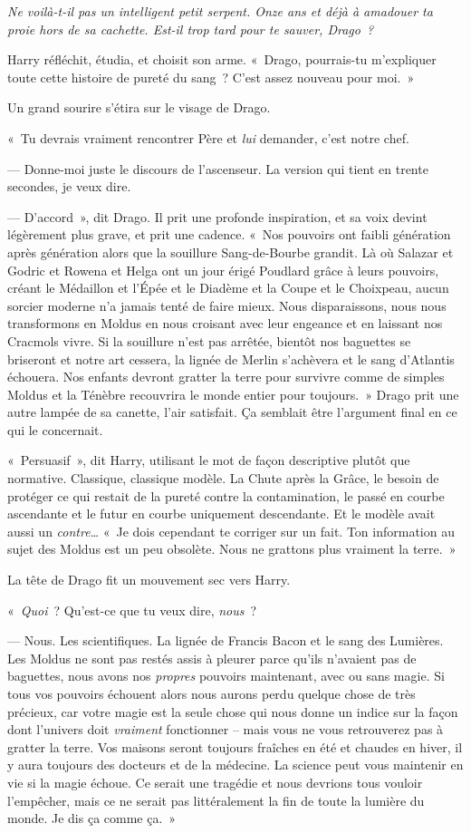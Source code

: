 \emph{Ne voilà-t-il pas un intelligent petit serpent. Onze ans et déjà à amadouer ta proie hors de sa cachette. Est-il trop tard pour te sauver, Drago~?}

Harry réfléchit, étudia, et choisit son arme. «~Drago, pourrais-tu m'expliquer toute cette histoire de pureté du sang~? C'est assez nouveau pour moi.~»

Un grand sourire s'étira sur le visage de Drago.

«~Tu devrais vraiment rencontrer Père et \emph{lui} demander, c'est notre chef.

--- Donne-moi juste le discours de l'ascenseur. La version qui tient en trente secondes, je veux dire.

--- D'accord~», dit Drago. Il prit une profonde inspiration, et sa voix devint légèrement plus grave, et prit une cadence. «~Nos pouvoirs ont faibli génération après génération alors que la souillure Sang-de-Bourbe grandit. Là où Salazar et Godric et Rowena et Helga ont un jour érigé Poudlard grâce à leurs pouvoirs, créant le Médaillon et l'Épée et le Diadème et la Coupe et le Choixpeau, aucun sorcier moderne n'a jamais tenté de faire mieux. Nous disparaissons, nous nous transformons en Moldus en nous croisant avec leur engeance et en laissant nos Cracmols vivre. Si la souillure n'est pas arrêtée, bientôt nos baguettes se briseront et notre art cessera, la lignée de Merlin s'achèvera et le sang d'Atlantis échouera. Nos enfants devront gratter la terre pour survivre comme de simples Moldus et la Ténèbre recouvrira le monde entier pour toujours.~» Drago prit une autre lampée de sa canette, l'air satisfait. Ça semblait être l'argument final en ce qui le concernait.

«~Persuasif~», dit Harry, utilisant le mot de façon descriptive plutôt que normative. Classique, classique modèle. La Chute après la Grâce, le besoin de protéger ce qui restait de la pureté contre la contamination, le passé en courbe ascendante et le futur en courbe uniquement descendante. Et le modèle avait aussi un \emph{contre}… «~Je dois cependant te corriger sur un fait. Ton information au sujet des Moldus est un peu obsolète. Nous ne grattons plus vraiment la terre.~»

La tête de Drago fit un mouvement sec vers Harry.

«~\emph{Quoi}~? Qu'est-ce que tu veux dire, \emph{nous}~?

--- Nous. Les scientifiques. La lignée de Francis Bacon et le sang des Lumières. Les Moldus ne sont pas restés assis à pleurer parce qu'ils n'avaient pas de baguettes, nous avons nos \emph{propres} pouvoirs maintenant, avec ou sans magie. Si tous vos pouvoirs échouent alors nous aurons perdu quelque chose de très précieux, car votre magie est la seule chose qui nous donne un indice sur la façon dont l'univers doit \emph{vraiment} fonctionner -- mais vous ne vous retrouverez pas à gratter la terre. Vos maisons seront toujours fraîches en été et chaudes en hiver, il y aura toujours des docteurs et de la médecine. La science peut vous maintenir en vie si la magie échoue. Ce serait une tragédie et nous devrions tous vouloir l'empêcher, mais ce ne serait pas littéralement la fin de toute la lumière du monde. Je dis ça comme ça.~»

